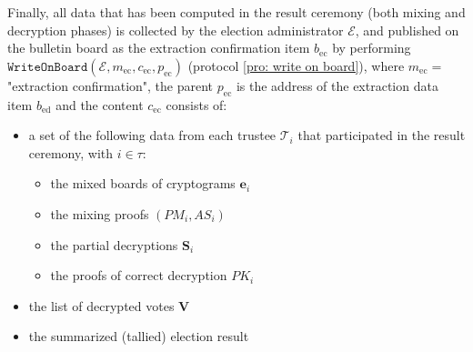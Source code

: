 Finally, all data that has been computed in the result ceremony (both mixing and decryption phases) is collected by the election administrator $\mathcal{E}$, and published on the bulletin board as the extraction confirmation item $b_\mathrm{ec}$ by performing $\mathtt{WriteOnBoard}(\mathcal{E}, m_\mathrm{ec}, c_\mathrm{ec}, p_\mathrm{ec})$ (protocol \ref{pro: write on board}), where $m_\mathrm{ec} = $ "extraction confirmation", the parent $p_\mathrm{ec}$ is the address of the extraction data item $b_\mathrm{ed}$  and the content $c_\mathrm{ec}$ consists of:
\begin{itemize}
    \item a set of the following data from each trustee $\mathcal{T}_i$ that participated in the result ceremony, with $i \in \tau$:
    \begin{itemize}
        \item the mixed boards of cryptograms $\boldsymbol{e}_i$
        \item the mixing proofs $(PM_i, AS_i)$
        \item the partial decryptions $\boldsymbol{S}_i$
        \item the proofs of correct decryption $PK_i$
    \end{itemize}
    \item the list of decrypted votes $\boldsymbol{V}$
    \item the summarized (tallied) election result
\end{itemize}
